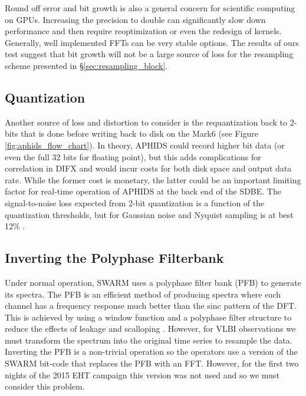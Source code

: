 Round off error and bit growth is also a general concern for scientific computing on GPUs.  
Increasing the precision to double can significantly slow down performance and then 
require reoptimization or even the redesign of kernels.  Generally, well implemented FFTs can 
be very stable options.  The results of ours test suggest that 
bit growth will not be a large source of loss for the resampling scheme presented in \S\ref{sec:resampling_block}.

\subsection{Quantization}
Another source of loss and distortion to consider is the requantization back to 2-bits that is done
before writing back to disk on the Mark6 (see Figure \ref{fig:aphids_flow_chart}).  In theory, APHIDS could 
record higher bit data (or even the full 32 bits for floating point), but this adds complications for 
correlation 
in DIFX and would incur costs for both disk space and output data rate.  While the former cost is monetary, the 
latter could be an important limiting factor for real-time operation of APHIDS at the back end of the SDBE.  
The signal-to-noise loss expected from 2-bit quantization is a function of the quantization 
thresholds, but for Gaussian noise and Nyquist sampling is at best 12\% \citep{cooper70,thompson01}.

\subsection{Inverting the Polyphase Filterbank}
Under normal operation, SWARM uses a polyphase filter bank (PFB) to generate its spectra.  The PFB is an 
efficient method of producing spectra where each channel has a frequency response much better than the 
sinc pattern of the DFT.  This is achieved by using a window function and a polyphase filter structure to reduce 
the effects of leakage and scalloping \citep{lyons11}.  However, for VLBI observations we must transform the 
spectrum into the original time series to resample the data.  Inverting the PFB is a non-trivial operation so 
the operators use a version of the SWARM bit-code that replaces the PFB with an FFT.  However, for the first 
two nights of the 2015 EHT campaign this version was not used and so we must consider this problem.

